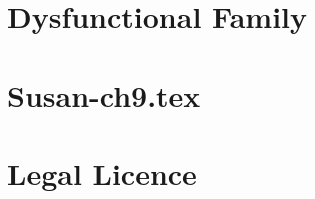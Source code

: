 \documentclass[12pt,twoside,onecolumn,openright,extrafontsizes]{memoir}
\begin{document}
\chapter{Dysfunctional Family}
\chapter{Susan-ch9.tex}
% 
\chapter{Legal Licence}


\end{document}
